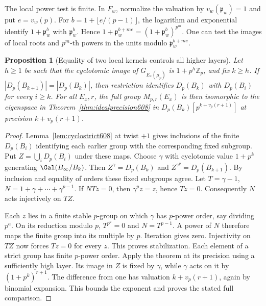 \documentclass[a4paper,11pt]{article}
\newtheorem{proposition}{Proposition}[section]
\theoremstyle{definition}
\theoremstyle{remark}
\newcommand{\ZZ}{\mathbb Z}\newcommand{\ord}{\operatorname{ord}}
\numberwithin{equation}{section}
\begin{document}
The local power test is finite. In \(F_w\), normalize the
valuation by \(v_w(\mathfrak p_w)=1\) and put \(e=v_w(p)\).
For \(b=1+\lfloor e/(p-1)\rfloor\), the logarithm and exponential
identify \(1+\mathfrak p_w^b\) with \(\mathfrak p_w^b\).
Hence \(1+\mathfrak p_w^{b+me}=(1+\mathfrak p_w^b)^{p^m}\).
One can test the images of local roots and \(p^m\)-th powers in
the units modulo \(\mathfrak p_w^{b+me}\).

\begin{proposition}[Equality of two local kernels controls all higher layers]
\leavevmode\label{prop:idealkernels608}
Let \(h\ge1\) be such that the cyclotomic image of
\(G_{E_*(\mu_p)}\) is \(1+p^h\ZZ_p\), and fix \(k\ge h\).
If \(|D_p(B_{k+1})|=|D_p(B_k)|\), then restriction identifies
\(D_p(B_k)\) with \(D_p(B_i)\) for every \(i\ge k\).
For all \(E_x,r\), the full group \(M_{p,r}(E_x)\) is then
isomorphic to the eigenspace in Theorem~\ref{thm:idealprecision608}
in \(D_p(B_k)[p^{k+v_p(r+1)}]\) at precision \(k+v_p(r+1)\).
\end{proposition}
\begin{proof}
Lemma~\ref{lem:cyclostrict608} at twist \(+1\) gives inclusions
of the finite \(D_p(B_i)\) identifying each earlier group with
the corresponding fixed subgroup. Put \(Z=\bigcup_iD_p(B_i)\)
under these maps. Choose \(\gamma\) with cyclotomic value
\(1+p^k\) generating \(\Gal(B_\infty/B_k)\).
Then \(Z^\gamma=D_p(B_k)\) and \(Z^{\gamma^p}=D_p(B_{k+1})\).
By inclusion and equality of orders these fixed subgroups agree.
Let \(T=\gamma-1\), \(N=1+\gamma+\cdots+\gamma^{p-1}\).
If \(NTz=0\), then \(\gamma^p z=z\), hence \(Tz=0\).
Consequently \(N\) acts injectively on \(TZ\).

Each \(z\) lies in a finite stable \(p\)-group on which \(\gamma\)
has \(p\)-power order, say dividing \(p^a\). On its reduction
modulo \(p\), \(T^{p^a}=0\) and \(N=T^{p-1}\). A power of \(N\)
therefore maps the finite group into its multiple by \(p\).
Iteration gives zero. Injectivity on \(TZ\) now forces \(Tz=0\)
for every \(z\). This proves stabilization. Each element of a
strict group has finite \(p\)-power order. Apply the theorem at
its precision using a sufficiently high layer. Its image in \(Z\)
is fixed by \(\gamma\), while \(\gamma\) acts on it by
\((1+p^k)^{r+1}\). The difference from one has valuation
\(k+v_p(r+1)\), again by binomial expansion. This bounds the
exponent and proves the stated full comparison.
\end{proof}
\end{document}
